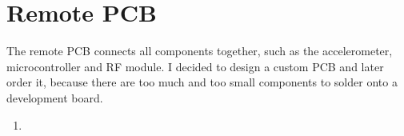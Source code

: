 \section{Remote PCB}
\label{sec:Remote PCB}
The remote PCB connects all components together, such as the accelerometer, microcontroller and RF module. I decided to design a custom PCB and later order it, because there are too much and too small components to solder onto a development board.

\begin{enumerate}
    \item 
\end{enumerate}